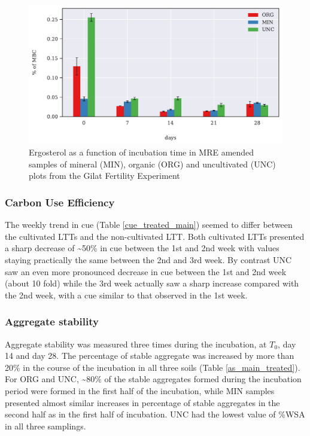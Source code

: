 			\begin{figure}[H]

				\centering
				\includegraphics[scale=0.8, width=\linewidth]{thesis_figures/main_incubation/MRE_treated/Erg-to-MBC.pdf}
				\caption{Ergosterol as a function of incubation time in MRE amended samples of mineral (MIN), organic (ORG) and uncultivated (UNC) plots from the Gilat Fertility Experiment}
				\label{fig:erg_treated_main}
			\end{figure}

		\vspace{5cm}

		\subsubsection{Carbon Use Efficiency}
		The weekly trend in \gls{cue} (Table \ref{cue_treated_main}) seemed to differ between the cultivated LTTs and the non-cultivated LTT. Both cultivated LTTs presented a sharp decrease of \~{}50\% in \gls{cue} between the 1st and 2nd week with values staying practically the same between the 2nd and 3rd week. By contrast UNC saw an even more pronounced decrease in \gls{cue} between the 1st and 2nd week (about 10 fold) while the 3rd week actually saw a sharp increase compared with the 2nd week, with a \gls{cue} similar to that observed in the 1st week.


		


		\subsubsection{Aggregate stability}

		Aggregate stability was measured three times during the incubation, at $ T_0 $, day 14 and day 28. The percentage of stable aggregate was increased by more than 20\% in the course of the incubation in all three soils (Table \ref{as_main_treated}). For ORG and UNC, \~{}80\% of the stable aggregates formed during the incubation period were formed in the first half of the incubation, while MIN samples presented almost similar increases in percentage of stable aggregates in the second half as in the first half of incubation. UNC had the lowest value of \%WSA in all three samplings.\\

		


%
